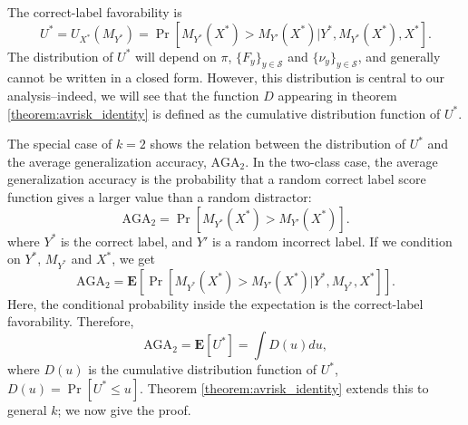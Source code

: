\documentclass[twoside,11pt]{article}
\newcommand{\E}{\textbf{E}}
\begin{document}
The correct-label favorability is 
\begin{equation}
U^* = U_{X^*}(M_{Y^*}) = \Pr[M_{Y^*}(X^*) > M_{Y'}(X^*)|Y^*,M_{Y^*}(X^*),X^*].
\end{equation}
The distribution of $U^*$ will depend on $\pi$, $\{F_y\}_{y \in \mathcal{S}}$ and $\{\nu_y\}_{y \in \mathcal{S}}$, and
generally cannot be written in a closed form.  However, this
distribution is central to our analysis--indeed, we will see that the
function ${D}$ appearing in theorem \ref{theorem:avrisk_identity}
is defined as the cumulative distribution function of $U^*$.

The special case of $k=2$ shows the relation between the distribution
of $U^*$ and the average generalization accuracy, $\text{AGA}_2$. In
the two-class case, the average generalization accuracy is the
probability that a random correct label score function gives a larger
value than a random distractor:
\[
\text{AGA}_2 = \Pr[M_{Y^*}(X^*) > M_{Y'}(X^*)].
\]
where $Y^*$ is the correct label, and $Y'$ is a random incorrect
label.  If we condition on $Y^*$, $M_{Y^*}$ and $X^*$, we get
\[
\text{AGA}_2 = \E[\Pr[M_{Y^*}(X^*) > M_{Y'}(X^*)|Y^*, M_{Y^*}, X^*]].
\]
Here, the conditional probability inside the expectation is the
correct-label favorability.  Therefore,
\[
\text{AGA}_2 = \E[U^*] = \int {D}(u) du,
\]
where ${D}(u)$ is the cumulative distribution function of $U^*$,
${D}(u) = \Pr[U^* \leq u]$.  Theorem \ref{theorem:avrisk_identity}
extends this to general $k$; we now give the proof.\newline


\end{document}
